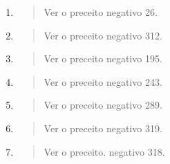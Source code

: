 \begin{enumerate}
\def\labelenumi{\arabic{enumi}.}
\setcounter{enumi}{452}
\item
  \begin{quote}
  Ver o preceito negativo 26.
  \end{quote}
\item
  \begin{quote}
  Ver o preceito negativo 312.
  \end{quote}
\item
  \begin{quote}
  Ver o preceito negativo 195.
  \end{quote}
\item
  \begin{quote}
  Ver o preceito negativo 243.
  \end{quote}
\item
  \begin{quote}
  Ver o preceito negativo 289.
  \end{quote}
\item
  \begin{quote}
  Ver o preceito negativo 319.
  \end{quote}
\item
  \begin{quote}
  Ver o preceito. negativo 318.
  \end{quote}
\end{enumerate}

